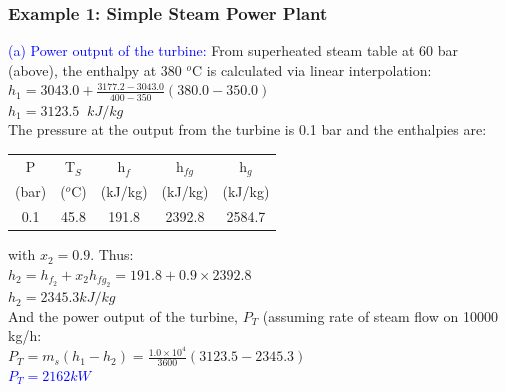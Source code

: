 \documentclass[10pt,compress,handout,ignorenonframetext]{beamer}
\begin{document}
\begin{frame}
 \frametitle{Example 1: Simple Steam Power Plant}

    \textcolor{blue}{(a) Power output of the turbine:} From superheated steam table at 60 bar (above), the enthalpy at 380 $^{o}$C is calculated via linear interpolation:\\
        $h_{1}=3043.0 + \displaystyle\frac{3177.2-3043.0}{400-350}\left(380.0-350.0\right)$\\
        $h_{1}=3123.5\;\;kJ/kg$ \\
 
    The pressure at the output from the turbine is 0.1 bar and the enthalpies are:\\
\begin{center}
    \begin{tabular}{|c c c c c|}
     \hline
     P    & T$_{S}$  & h$_{f}$  & h$_{fg}$ & h$_{g}$ \\
    (bar) & ($^{o}$C) & (kJ/kg) & (kJ/kg) & (kJ/kg) \\
    \hline
     0.1 &  45.8     & 191.8   & 2392.8  & 2584.7 \\
    \hline 
    \end{tabular}
\end{center}

    with $x_{2}=0.9$. Thus:\\
    $h_{2}=h_{f_{2}}+x_{2}h_{fg_{2}} = 191.8 + 0.9\times 2392.8$\\
    $h_{2}=2345.3 kJ/kg$\\
    And the power output of the turbine, $P_{T}$ (assuming rate of steam flow on 10000 kg/h:\\
    $P_{T}=m_{s}\left(h_{1}-h_{2}\right)=\displaystyle\frac{1.0\times 10^{4}}{3600}\left(3123.5-2345.3\right)$\\
    \textcolor{blue}{$P_{T}=2162 kW$}

 \normalsize
\end{frame}
\end{document}
